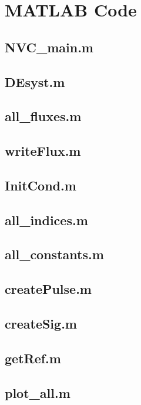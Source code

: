 \section{MATLAB Code}

\subsection*{NVC\_main.m}
    
\newpage
\subsection*{DEsyst.m}
    
\newpage
\subsection*{all\_fluxes.m}
    
\newpage
\subsection*{writeFlux.m}
    
\newpage
\subsection*{InitCond.m}
    
\newpage
\subsection*{all\_indices.m}
    
\newpage
\subsection*{all\_constants.m}
    
\newpage
\subsection*{createPulse.m}
    
\newpage
\subsection*{createSig.m}
    
\newpage
\subsection*{getRef.m}
    
\newpage
\subsection*{plot\_all.m}
    